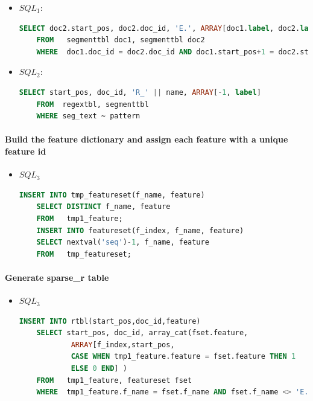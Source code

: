 \documentclass[11pt,letterpaper]{article}
\begin{document}
\begin{itemize}
\item $SQL_1$:\\
\begin{lstlisting}[language=SQL,gobble=4]
    SELECT doc2.start_pos, doc2.doc_id, 'E.', ARRAY[doc1.label, doc2.label]
    FROM   segmenttbl doc1, segmenttbl doc2
    WHERE  doc1.doc_id = doc2.doc_id AND doc1.start_pos+1 = doc2.start_pos
\end{lstlisting}

\item $SQL_2$:\\
\begin{lstlisting}[language=SQL,gobble=4]
    SELECT start_pos, doc_id, 'R_' || name, ARRAY[-1, label]
    FROM  regextbl, segmenttbl
    WHERE seg_text ~ pattern
\end{lstlisting}
\end{itemize}

\paragraph{Build the feature dictionary and assign each feature with a unique feature id}
\begin{itemize}
\item $SQL_3$\\ 
\begin{lstlisting}[language=SQL,gobble=4]
    INSERT INTO tmp_featureset(f_name, feature) 
    SELECT DISTINCT f_name, feature
    FROM   tmp1_feature;
    INSERT INTO featureset(f_index, f_name, feature) 
    SELECT nextval('seq')-1, f_name, feature
    FROM   tmp_featureset;
\end{lstlisting}
\end{itemize}

\paragraph{Generate sparse\_r table}
\begin{itemize}
\item $SQL_3$\\ 
\begin{lstlisting}[language=SQL,gobble=4]
    INSERT INTO rtbl(start_pos,doc_id,feature)
    SELECT start_pos, doc_id, array_cat(fset.feature, 
			ARRAY[f_index,start_pos, 
			CASE WHEN tmp1_feature.feature = fset.feature THEN 1
			ELSE 0 END] )
    FROM   tmp1_feature, featureset fset
    WHERE  tmp1_feature.f_name = fset.f_name AND fset.f_name <> 'E.';
\end{lstlisting}
\end{itemize}
\end{document}
